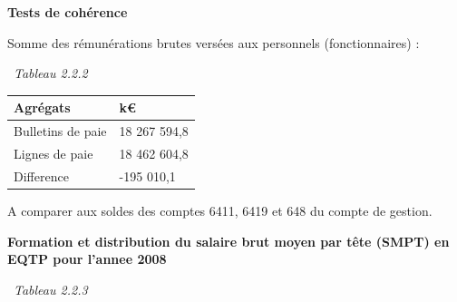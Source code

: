 \textbf{Tests de cohérence}

Somme des rémunérations brutes versées aux personnels (fonctionnaires) :

~\emph{Tableau 2.2.2}

\begin{longtable}[]{@{}ll@{}}
\toprule
Agrégats & k€\tabularnewline
\midrule
\endhead
Bulletins de paie & 18 267 594,8\tabularnewline
Lignes de paie & 18 462 604,8\tabularnewline
Difference & -195 010,1\tabularnewline
\bottomrule
\end{longtable}

A comparer aux soldes des comptes 6411, 6419 et 648 du compte de
gestion.

\textbf{Formation et distribution du salaire brut moyen par tête (SMPT)
en EQTP pour l'annee 2008 }

~\emph{Tableau 2.2.3}

